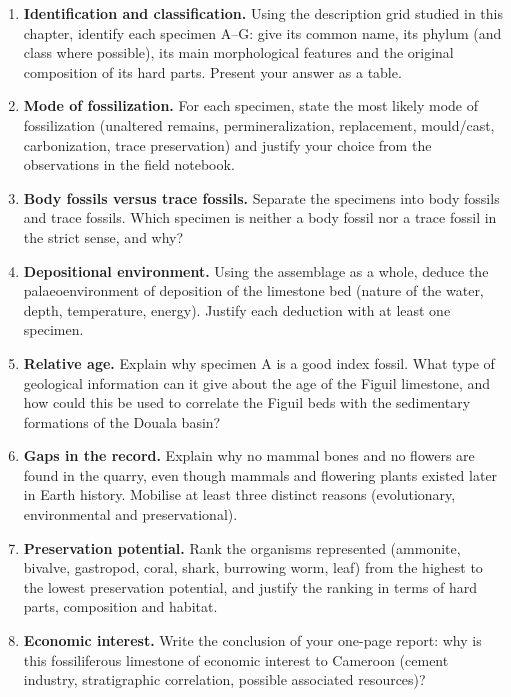 \documentclass[11pt]{article}
\newcommand{\cle}[1]{{\popxbold\color{popdark}#1}}
\begin{document}
\begin{enumerate}
\item \textbf{Identification and classification.} Using the description grid studied in this chapter, identify each specimen A--G: give its common name, its \cle{phylum} (and class where possible), its main morphological features and the original composition of its hard parts. Present your answer as a table.
\item \textbf{Mode of fossilization.} For each specimen, state the most likely \cle{mode of fossilization} (unaltered remains, permineralization, replacement, mould/cast, carbonization, trace preservation) and justify your choice from the observations in the field notebook.
\item \textbf{Body fossils versus trace fossils.} Separate the specimens into \cle{body fossils} and \cle{trace fossils}. Which specimen is neither a body fossil nor a trace fossil in the strict sense, and why?
\item \textbf{Depositional environment.} Using the assemblage as a whole, deduce the \cle{palaeoenvironment} of deposition of the limestone bed (nature of the water, depth, temperature, energy). Justify each deduction with at least one specimen.
\item \textbf{Relative age.} Explain why specimen A is a good \cle{index fossil}. What type of geological information can it give about the age of the Figuil limestone, and how could this be used to correlate the Figuil beds with the sedimentary formations of the Douala basin?
\item \textbf{Gaps in the record.} Explain why no mammal bones and no flowers are found in the quarry, even though mammals and flowering plants existed later in Earth history. Mobilise at least three distinct reasons (evolutionary, environmental and preservational).
\item \textbf{Preservation potential.} Rank the organisms represented (ammonite, bivalve, gastropod, coral, shark, burrowing worm, leaf) from the highest to the lowest \cle{preservation potential}, and justify the ranking in terms of hard parts, composition and habitat.
\item \textbf{Economic interest.} Write the conclusion of your one-page report: why is this fossiliferous limestone of economic interest to Cameroon (cement industry, stratigraphic correlation, possible associated resources)?
\end{enumerate}
\end{document}
